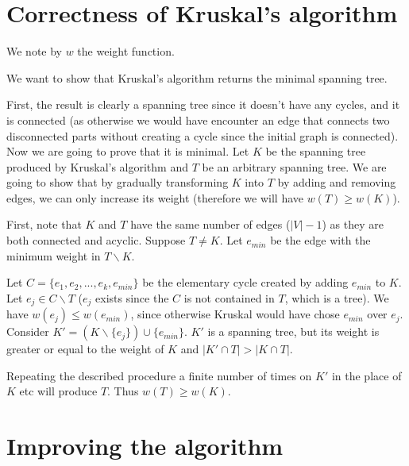 \documentclass{article}
\begin{document}
\section{Correctness of Kruskal's algorithm}

We note by $w$ the weight function.

We want to show that Kruskal's algorithm returns the minimal spanning tree.

First, the result is clearly a spanning tree since it doesn't have any cycles, and it is connected (as otherwise we would have encounter an edge that connects two disconnected parts without creating a cycle since the initial graph is connected). Now we are going to prove that it is minimal. 
Let $K$ be the spanning tree produced by Kruskal's algorithm and $T$ be an arbitrary spanning tree. 
We are going to show that by gradually transforming $K$ into $T$ by adding and removing edges, we can only increase its weight (therefore we will have $w(T)\geq w(K)$).

First, note that $K$ and $T$ have the same number of edges ($|V|-1$) as they are both connected and acyclic. Suppose $T\neq K$. Let $e_{min}$ be the edge with the minimum weight in $T\backslash K$. 

Let $C = \{e_1,e_2,...,e_k,e_{min}\}$ be the elementary cycle created by adding $e_{min}$ to $K$. Let $e_j \in C \backslash T$ ($e_j$ exists since the $C$ is not contained in $T$, which is a tree). We have $w(e_j)\leq w(e_{min})$, since otherwise Kruskal would have chose $e_{min}$ over $e_j$. Consider $K' = (K\backslash \{e_j\})\cup\{e_{min}\}$. $K'$ is a spanning tree, but its weight is greater or equal to the weight of $K$ and $|K'\cap T| > |K \cap T|$. 

Repeating the described procedure a finite number of times on $K'$ in the place of $K$ etc will produce $T$. Thus $w(T)\geq w(K)$.

\section{Improving the algorithm}
\end{document}
